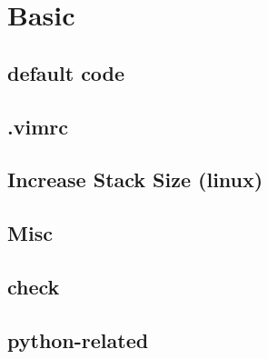 \documentclass[a4paper,10pt,twocolumn,oneside]{article}
\begin{document}
\pagestyle{fancy}
\fancyfoot{}
\fancyhead[R]{\thepage}
\renewcommand{\headrulewidth}{0.4pt}
\renewcommand{\contentsname}{Contents} 

\scriptsize
\tableofcontents


\section{Basic}

\subsection{default code}


\subsection{.vimrc}


\subsection{Increase Stack Size (linux)}


% 

\subsection{Misc}


\subsection{check}


\subsection{python-related}


% 
\end{document}
